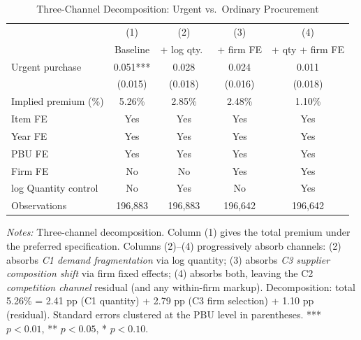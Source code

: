 \begin{table}[ht]
  \centering
  \caption{Three-Channel Decomposition: Urgent vs.\ Ordinary Procurement}
  \label{tab:three_channel_uo}
  \small
  \begin{threeparttable}
  \begin{tabular}{lcccc}
    \hline\hline
                                    & (1)         & (2)            & (3)        & (4)             \\
                                    & Baseline    & + log qty.\   & + firm FE  & + qty + firm FE \\
    \hline
    Urgent purchase & 0.051*** & 0.028 & 0.024 & 0.011 \\
                                    & (0.015) & (0.018) & (0.016) & (0.018) \\[3pt]
    Implied premium (\%)            & 5.26\% & 2.85\% & 2.48\% & 1.10\% \\
    \hline
    Item FE                          & Yes & Yes & Yes & Yes \\
    Year FE                          & Yes & Yes & Yes & Yes \\
    PBU FE                           & Yes & Yes & Yes & Yes \\
    Firm FE                          & No  & No  & Yes & Yes \\
    log Quantity control             & No  & Yes & No  & Yes \\
    \hline
    Observations                     & 196,883 & 196,883 & 196,642 & 196,642 \\
    \hline\hline
  \end{tabular}
  \begin{tablenotes}
    \small
    \item \textit{Notes:} Three-channel decomposition. Column (1) gives
    the total premium under the preferred specification. Columns (2)--(4)
    progressively absorb channels: (2) absorbs \emph{C1 demand fragmentation}
    via log quantity; (3) absorbs \emph{C3 supplier composition shift}
    via firm fixed effects; (4) absorbs both, leaving the C2
    \emph{competition channel} residual (and any within-firm markup).
    Decomposition: total 5.26\% = 2.41 pp (C1 quantity) + 2.79 pp (C3 firm
    selection) + 1.10 pp (residual).
    Standard errors clustered at the PBU level in parentheses.
    *** $p<0.01$, ** $p<0.05$, * $p<0.10$.
  \end{tablenotes}
  \end{threeparttable}
\end{table}
